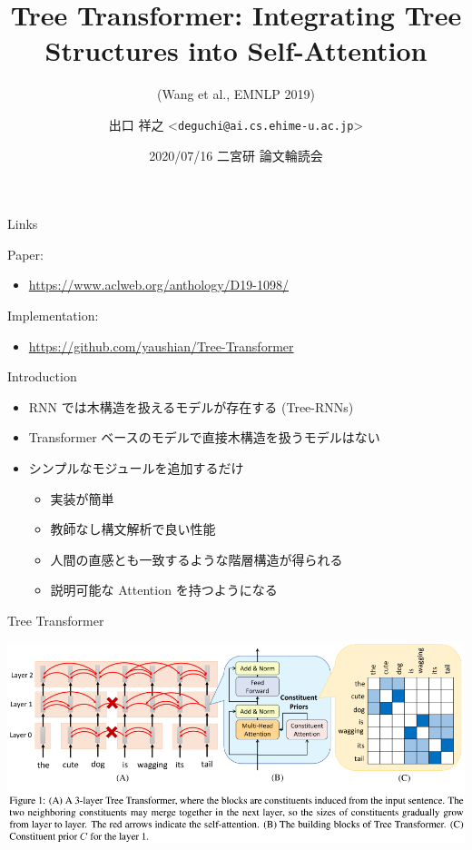 \documentclass[unicode, 12pt, aspectratio=43]{beamer}
\author{出口 祥之 <\texttt{deguchi@ai.cs.ehime-u.ac.jp}>}
\date{2020/07/16 二宮研 論文輪読会}
\title{Tree Transformer: Integrating Tree Structures into Self-Attention}
\subtitle{(Wang et al., EMNLP 2019)}
\institute{}
\begin{document}
\maketitle

\begin{frame}[label={sec:org175c6f6}]{Links}
\begin{block}{Paper:}
\begin{itemize}
\item \url{https://www.aclweb.org/anthology/D19-1098/}
\end{itemize}
\end{block}
\begin{block}{Implementation:}
\begin{itemize}
\item \url{https://github.com/yaushian/Tree-Transformer}
\end{itemize}
\end{block}
\end{frame}

\begin{frame}[label={sec:orgeafaf79}]{Introduction}
\begin{itemize}
\item RNN では木構造を扱えるモデルが存在する (Tree-RNNs)
\item Transformer ベースのモデルで直接木構造を扱うモデルはない

\item シンプルなモジュールを追加するだけ
\begin{itemize}
\item 実装が簡単
\item 教師なし構文解析で良い性能
\item 人間の直感とも一致するような階層構造が得られる
\item 説明可能な Attention を持つようになる
\end{itemize}
\end{itemize}
\end{frame}

\begin{frame}[label={sec:orgaeaefe4}]{Tree Transformer}
\begin{center}
\includegraphics[width=\linewidth]{./figure/Figure1.pdf}
\end{center}
\end{frame}
\end{document}
